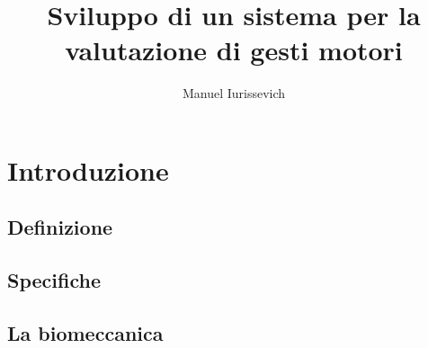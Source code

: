 \documentclass [10pt, a4paper, onecolumn, oneside] {scrreprt}
\title{Sviluppo di un sistema per la valutazione di gesti motori}
\author{Manuel Iurissevich}
\date{} %
\numberwithin{endnote}{chapter}
\begin{document}




\newcommand{\iic}{{\relsize{-1} I$^2$C}}
\newcommand{\usb}{{\relsize{-1} {USB}}}
\newcommand{\sda}{{\relsize{-1} {SDA}}}
\newcommand{\scl}{{\relsize{-1} {SCL}}}
\newcommand{\vcc}{{\relsize{-1} \(V_{CC}\)}}
\newcommand{\master}{\textit{master}}
\newcommand{\slave}{\textit{slave}}
\newcommand{\Ack}{\textit{acknowledge}}
\newcommand{\ack}{\relsize{-1}{ACK}}
\newcommand{\pullup}{\textit{pull-up}}














	
\setcounter{tocdepth}{2}
\tableofcontents
\vfill
\thispagestyle{empty}
\eject


\newpage
\thispagestyle{empty}
\mbox{}





\chapter{Introduzione} \label{cap:intro}
		 \vfill\eject
	\section{Definizione} \label{sez:defnizione}
		 \vfill
	\section{Specifiche} \label{sez:specifiche}
		 \vfill
	\section {La biomeccanica}
	  \label{sez:biomeccanica}
		 \vfill
\end{document}
